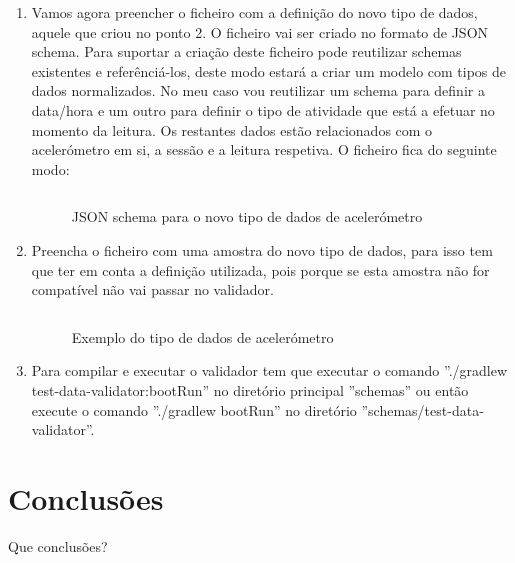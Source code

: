 \documentclass[11pt,twoside,a4paper]{report}
\begin{document}
\begin{enumerate}
\begin{figure}[!ht]
  \label{f:directorynewsample}
\end{figure}
  
\item Vamos agora preencher o ficheiro com a definição do novo tipo de dados, aquele que criou no ponto 2. O ficheiro vai ser criado no formato de \gls{JSON} schema. Para suportar a criação deste ficheiro pode reutilizar schemas existentes \cite{schema-library} e referênciá-los, deste modo estará a criar um modelo com tipos de dados normalizados. No meu caso vou reutilizar um schema para definir a data/hora e um outro para definir o tipo de atividade que está a efetuar no momento da leitura. Os restantes dados estão relacionados com o acelerómetro em si, a sessão e a leitura respetiva.
O ficheiro fica do seguinte modo: 

\begin{figure}[H]
\inputminted{json}{code/accelerometer-1.0.json}
\caption[\gls{JSON} schema para o novo tipo de dados de acelerómetro]{\gls{JSON} schema para o novo tipo de dados de acelerómetro}
\label{f:accelerometer-json-schema}
\end{figure}

\item Preencha o ficheiro com uma amostra do novo tipo de dados, para isso tem que ter em conta a definição utilizada, pois porque se esta amostra não for compatível não vai passar no validador.

\begin{figure}[H]
\inputminted{json}{code/example.json}
\caption[Exemplo do tipo de dados de acelerómetro]{Exemplo do tipo de dados de acelerómetro}
\label{f:accelerometer-json-data}
\end{figure}

\item Para compilar e executar o validador tem que executar o comando ''./gradlew test-data-validator:bootRun'' no diretório principal ''schemas'' ou então execute o comando ''./gradlew bootRun'' no diretório ''schemas/test-data-validator''. 


\end{enumerate}

\chapter{Conclus\~ oes}

Que conclus\~oes?

%
%
\cleardoublepage

\renewcommand{\bibname}{Lista de Referências}


\cleardoublepage
\end{document}
